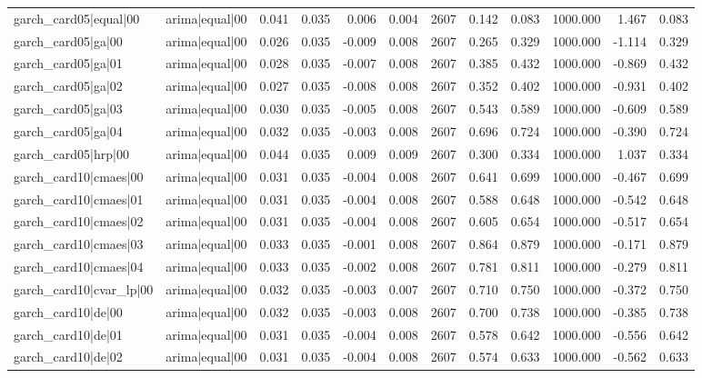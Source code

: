 \begin{table}
\begin{tabular}{llrrrrrrrrrr}
garch\_card05|equal|00 & arima|equal|00 & 0.041 & 0.035 & 0.006 & 0.004 & 2607 & 0.142 & 0.083 & 1000.000 & 1.467 & 0.083 \\
garch\_card05|ga|00 & arima|equal|00 & 0.026 & 0.035 & -0.009 & 0.008 & 2607 & 0.265 & 0.329 & 1000.000 & -1.114 & 0.329 \\
garch\_card05|ga|01 & arima|equal|00 & 0.028 & 0.035 & -0.007 & 0.008 & 2607 & 0.385 & 0.432 & 1000.000 & -0.869 & 0.432 \\
garch\_card05|ga|02 & arima|equal|00 & 0.027 & 0.035 & -0.008 & 0.008 & 2607 & 0.352 & 0.402 & 1000.000 & -0.931 & 0.402 \\
garch\_card05|ga|03 & arima|equal|00 & 0.030 & 0.035 & -0.005 & 0.008 & 2607 & 0.543 & 0.589 & 1000.000 & -0.609 & 0.589 \\
garch\_card05|ga|04 & arima|equal|00 & 0.032 & 0.035 & -0.003 & 0.008 & 2607 & 0.696 & 0.724 & 1000.000 & -0.390 & 0.724 \\
garch\_card05|hrp|00 & arima|equal|00 & 0.044 & 0.035 & 0.009 & 0.009 & 2607 & 0.300 & 0.334 & 1000.000 & 1.037 & 0.334 \\
garch\_card10|cmaes|00 & arima|equal|00 & 0.031 & 0.035 & -0.004 & 0.008 & 2607 & 0.641 & 0.699 & 1000.000 & -0.467 & 0.699 \\
garch\_card10|cmaes|01 & arima|equal|00 & 0.031 & 0.035 & -0.004 & 0.008 & 2607 & 0.588 & 0.648 & 1000.000 & -0.542 & 0.648 \\
garch\_card10|cmaes|02 & arima|equal|00 & 0.031 & 0.035 & -0.004 & 0.008 & 2607 & 0.605 & 0.654 & 1000.000 & -0.517 & 0.654 \\
garch\_card10|cmaes|03 & arima|equal|00 & 0.033 & 0.035 & -0.001 & 0.008 & 2607 & 0.864 & 0.879 & 1000.000 & -0.171 & 0.879 \\
garch\_card10|cmaes|04 & arima|equal|00 & 0.033 & 0.035 & -0.002 & 0.008 & 2607 & 0.781 & 0.811 & 1000.000 & -0.279 & 0.811 \\
garch\_card10|cvar\_lp|00 & arima|equal|00 & 0.032 & 0.035 & -0.003 & 0.007 & 2607 & 0.710 & 0.750 & 1000.000 & -0.372 & 0.750 \\
garch\_card10|de|00 & arima|equal|00 & 0.032 & 0.035 & -0.003 & 0.008 & 2607 & 0.700 & 0.738 & 1000.000 & -0.385 & 0.738 \\
garch\_card10|de|01 & arima|equal|00 & 0.031 & 0.035 & -0.004 & 0.008 & 2607 & 0.578 & 0.642 & 1000.000 & -0.556 & 0.642 \\
garch\_card10|de|02 & arima|equal|00 & 0.031 & 0.035 & -0.004 & 0.008 & 2607 & 0.574 & 0.633 & 1000.000 & -0.562 & 0.633 \\

\end{tabular}
\end{table}
